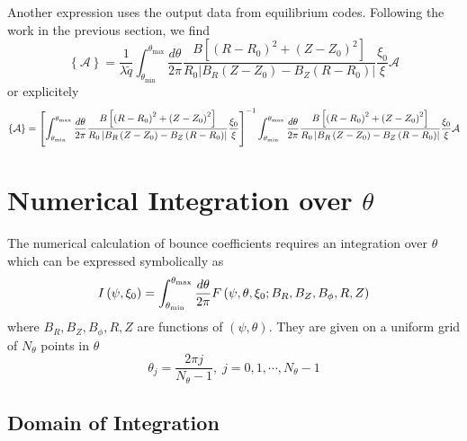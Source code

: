 \documentclass{article}
\begin{document}
Another expression uses the output data from equilibrium codes. Following
the work in the previous section, we find 
\begin{equation}
\left\{ \mathcal{A}\right\} =\frac{1}{\lambda \widetilde{q}}\int_{\theta
_{\min }}^{\theta _{\max }}\frac{d\theta }{2\pi }\frac{B\left[ \left(
R-R_{0}\right) ^{2}+\left( Z-Z_{0}\right) ^{2}\right] }{R_{0}\left|
B_{R}\left( Z-Z_{0}\right) -B_{Z}\left( R-R_{0}\right) \right| }\frac{\xi
_{0}}{\xi }\mathcal{A}
\end{equation}
or explicitely
\begin{equation}
\left\{ \mathcal{A}\right\} =\left[ \int_{\theta _{\min }}^{\theta _{\max }}%
\frac{d\theta }{2\pi }\frac{B\left[ \left( R-R_{0}\right) ^{2}+\left(
Z-Z_{0}\right) ^{2}\right] }{R_{0}\left| B_{R}\left( Z-Z_{0}\right)
-B_{Z}\left( R-R_{0}\right) \right| }\frac{\xi _{0}}{\xi }\right]
^{-1}\int_{\theta _{\min }}^{\theta _{\max }}\frac{d\theta }{2\pi }\frac{%
B\left[ \left( R-R_{0}\right) ^{2}+\left( Z-Z_{0}\right) ^{2}\right] }{%
R_{0}\left| B_{R}\left( Z-Z_{0}\right) -B_{Z}\left( R-R_{0}\right) \right| }%
\frac{\xi _{0}}{\xi }\mathcal{A}
\end{equation}

\section{Numerical Integration over $\theta $}

The numerical calculation of bounce coefficients requires an integration
over $\theta $ which can be expressed symbolically as 
\begin{equation}
I\left( \psi ,\xi _{0}\right) =\int_{\theta _{\min }}^{\theta _{\max }}\frac{%
d\theta }{2\pi }F\left( \psi ,\theta ,\xi _{0};B_{R},B_{Z},B_{\phi
},R,Z\right)
\end{equation}
where $B_{R},B_{Z},B_{\phi },R,Z$ are functions of $\left( \psi ,\theta
\right) $. They are given on a uniform grid of $N_{\theta }$ points in $%
\theta $ 
\begin{equation}
\theta _{j}=\frac{2\pi j}{N_{\theta }-1},\;j=0,1,\cdots ,N_{\theta }-1
\end{equation}

\subsection{Domain of Integration}
\end{document}
